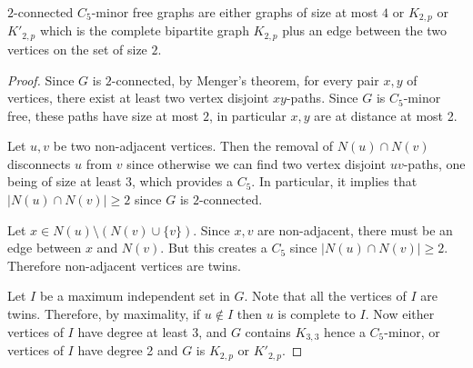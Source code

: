 \documentclass[a4paper,thm-restate,USenglish]{lipics-v2019}
\begin{document}
\begin{lemma}\label{lem:C5minor}
$2$-connected $C_5$-minor free graphs are either graphs of size at most $4$ or $K_{2,p}$ or $K'_{2,p}$ which is the complete bipartite graph $K_{2,p}$ plus an edge between the two vertices on the set of size $2$.
\end{lemma}
\begin{proof}
Since $G$ is $2$-connected, by Menger's theorem, for every pair $x,y$ of vertices, there exist at least two vertex disjoint $xy$-paths. Since $G$ is $C_5$-minor free, these paths have size at most $2$, in particular $x,y$ are at distance at most 2. 

Let $u,v$ be two non-adjacent vertices. Then the removal of $N(u) \cap N(v)$ disconnects $u$ from $v$ since otherwise we can find two vertex disjoint $uv$-paths, one being of size at least $3$, which provides a $C_5$. In particular, it implies that $|N(u) \cap N(v)| \ge 2$ since $G$ is $2$-connected.

Let $x\in N(u)\setminus (N(v)\cup \{v\})$. Since $x,v$ are non-adjacent, there must be an edge between $x$ and $N(v)$. But this creates a $C_5$ since $|N(u)\cap N(v)|\geqslant 2$. Therefore non-adjacent vertices are twins. 

Let $I$ be a maximum independent set in $G$. Note that all the vertices of $I$ are twins. Therefore, by maximality, if $u\notin I$ then $u$ is complete to $I$. Now either vertices of $I$ have degree at least 3, and $G$ contains $K_{3,3}$ hence a $C_5$-minor, or vertices of $I$ have degree 2 and $G$ is $K_{2,p}$ or $K'_{2,p}$.
\end{proof}
\end{document}
